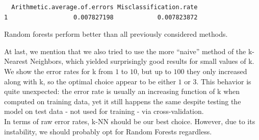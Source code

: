 \documentclass[
  letterpaper,
  DIV=11,
  numbers=noendperiod]{scrartcl}
\begin{document}
\begin{verbatim}
  Arithmetic.average.of.errors Misclassification.rate
1                  0.007827198            0.007823872
\end{verbatim}

Random forests perform better than all previously considered methods.

At last, we mention that we also tried to use the more ``naive'' method
of the k-Nearest Neighbors, which yielded surprisingly good results for
small values of k. We show the error rates for k from \(1\) to \(10\),
but up to \(100\) they only increased along with k, so the optimal
choice appear to be either \(1\) or \(3\). This behavior is quite
unexpected: the error rate is usually an increasing function of k when
computed on training data, yet it still happens the same despite testing
the model on test data - not used for training - via cross-validation.\\
In terms of raw error rates, k-NN should be our best choice. However,
due to its instability, we should probably opt for Random Forests
regardless.
\end{document}
